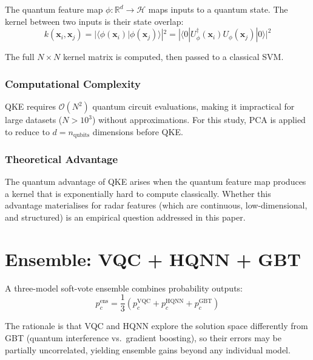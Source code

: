 \documentclass[journal]{IEEEtran}
\newcommand{\ket}[1]{|#1\rangle}
\newcommand{\bra}[1]{\langle #1|}
\newcommand{\braket}[2]{\langle #1 | #2 \rangle}
\newcommand{\vect}[1]{\boldsymbol{#1}}
\begin{document}
The quantum feature map $\phi: \mathbb{R}^d \to \mathcal{H}$ maps inputs to a
quantum state. The kernel between two inputs is their state overlap:
\begin{equation}
  k(\vect{x}_i, \vect{x}_j) = |\braket{\phi(\vect{x}_i)}{\phi(\vect{x}_j)}|^2
  = |\bra{0}U_\phi^\dagger(\vect{x}_i) U_\phi(\vect{x}_j)\ket{0}|^2
\end{equation}

The full $N \times N$ kernel matrix is computed, then passed to a classical SVM.

\subsubsection{Computational Complexity}

QKE requires $\mathcal{O}(N^2)$ quantum circuit evaluations, making it
impractical for large datasets ($N > 10^3$) without approximations.
For this study, PCA is applied to reduce to $d = n_\text{qubits}$ dimensions
before QKE.

\subsubsection{Theoretical Advantage}

The quantum advantage of QKE arises when the quantum feature map produces a
kernel that is exponentially hard to compute classically. Whether this advantage
materialises for radar features (which are continuous, low-dimensional, and
structured) is an empirical question addressed in this paper.

\section{Ensemble: VQC + HQNN + GBT}
\label{sec:ensemble}

A three-model soft-vote ensemble combines probability outputs:
\begin{equation}
  p_c^{\text{ens}} = \frac{1}{3}\left(p_c^{\text{VQC}} + p_c^{\text{HQNN}} + p_c^{\text{GBT}}\right)
\end{equation}

The rationale is that VQC and HQNN explore the solution space differently
from GBT (quantum interference vs.\ gradient boosting), so their errors
may be partially uncorrelated, yielding ensemble gains beyond any individual model.

\end{document}
